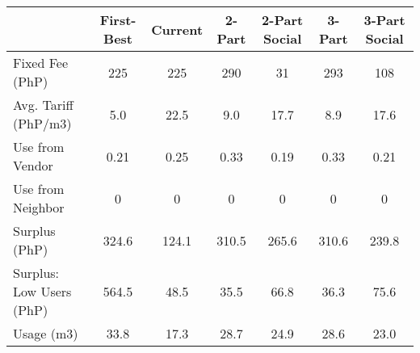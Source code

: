 \begin{tabular}{lcccccc}
  & First-Best & Current & 2-Part  & 2-Part Social  & 3-Part & 3-Part Social \\
\hline
Fixed Fee (PhP) &225&225&290&31&293&108\\
Avg. Tariff (PhP/m3) &5.0&22.5&9.0&17.7&8.9&17.6\\
Use from Vendor &0.21 &0.25 &0.33 &0.19 &0.33 &0.21\\
Use from Neighbor &0 &0 &0 &0 &0 &0 \\
Surplus (PhP) &324.6&124.1&310.5&265.6&310.6&239.8\\
Surplus: Low Users (PhP) &564.5&48.5&35.5&66.8&36.3&75.6\\
Usage (m3) &33.8&17.3&28.7&24.9&28.6&23.0\\
\hline
\end{tabular}
